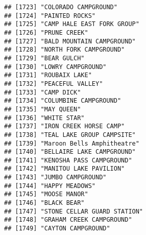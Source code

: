 \documentclass[
]{article}
\begin{document}
\begin{verbatim}
## [1723] "COLORADO CAMPGROUND"                                                                 
## [1724] "PAINTED ROCKS"                                                                       
## [1725] "CAMP HALE EAST FORK GROUP"                                                           
## [1726] "PRUNE CREEK"                                                                         
## [1727] "BALD MOUNTAIN CAMPGROUND"                                                            
## [1728] "NORTH FORK CAMPGROUND"                                                               
## [1729] "BEAR GULCH"                                                                          
## [1730] "LOWRY CAMPGROUND"                                                                    
## [1731] "ROUBAIX LAKE"                                                                        
## [1732] "PEACEFUL VALLEY"                                                                     
## [1733] "CAMP DICK"                                                                           
## [1734] "COLUMBINE CAMPGROUND"                                                                
## [1735] "MAY QUEEN"                                                                           
## [1736] "WHITE STAR"                                                                          
## [1737] "IRON CREEK HORSE CAMP"                                                               
## [1738] "TEAL LAKE GROUP CAMPSITE"                                                            
## [1739] "Maroon Bells Amphitheatre"                                                           
## [1740] "BELLAIRE LAKE CAMPGROUND"                                                            
## [1741] "KENOSHA PASS CAMPGROUND"                                                             
## [1742] "MANITOU LAKE PAVILION"                                                               
## [1743] "JUMBO CAMPGROUND"                                                                    
## [1744] "HAPPY MEADOWS"                                                                       
## [1745] "MOOSE MANOR"                                                                         
## [1746] "BLACK BEAR"                                                                          
## [1747] "STONE CELLAR GUARD STATION"                                                          
## [1748] "GRAHAM CREEK CAMPGROUND"                                                             
## [1749] "CAYTON CAMPGROUND"                                                                   

\end{verbatim}
\end{document}

